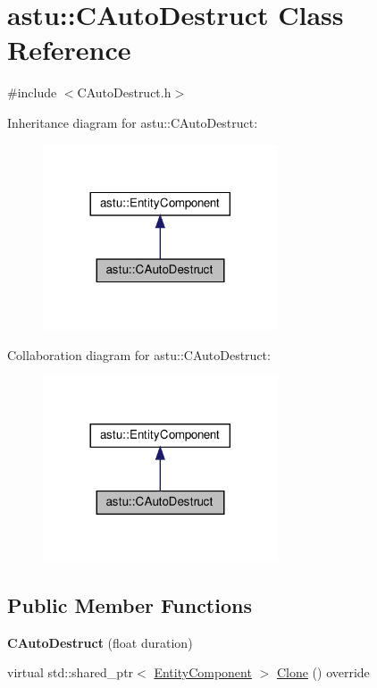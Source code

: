 \hypertarget{classastu_1_1CAutoDestruct}{}\section{astu\+:\+:C\+Auto\+Destruct Class Reference}
\label{classastu_1_1CAutoDestruct}


{\ttfamily \#include $<$C\+Auto\+Destruct.\+h$>$}



Inheritance diagram for astu\+:\+:C\+Auto\+Destruct\+:
\nopagebreak
\begin{figure}[H]
\begin{center}
\leavevmode
\includegraphics[width=197pt]{classastu_1_1CAutoDestruct__inherit__graph}
\end{center}
\end{figure}


Collaboration diagram for astu\+:\+:C\+Auto\+Destruct\+:
\nopagebreak
\begin{figure}[H]
\begin{center}
\leavevmode
\includegraphics[width=197pt]{classastu_1_1CAutoDestruct__coll__graph}
\end{center}
\end{figure}
\subsection*{Public Member Functions}
\begin{DoxyCompactItemize}
\item 
\mbox{\label{classastu_1_1CAutoDestruct_a0a2c5d8a934749548f6b65a91b782e9f}} 
{\bfseries C\+Auto\+Destruct} (float duration)
\item 
virtual std\+::shared\+\_\+ptr$<$ \hyperlink{classastu_1_1EntityComponent}{Entity\+Component} $>$ \hyperlink{classastu_1_1CAutoDestruct_a25a9d187d42fbc3fd16311f74894b345}{Clone} () override
\end{DoxyCompactItemize}
